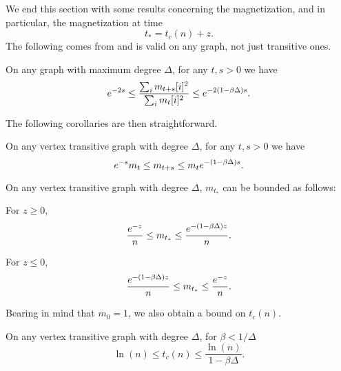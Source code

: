 
We end this section with some results concerning the magnetization, and in particular, the magnetization at time
\begin{equation}
	t_* = t_c(n) + z.
\end{equation}
The following comes from \cite{Lubetzky2017-nc} and is valid on any graph, not just transitive ones.
\begin{lemma}
	On any graph with maximum degree $\Delta$, for any $t, s > 0$ we have
	\begin{equation}
		e^{-2s} \leq \frac{\sum_i m_{t+s}[i]^2}{\sum_i m_t[i]^2} \leq e^{-2(1 - \beta \Delta)s}.
	\end{equation}
\end{lemma}
The following corollaries are then straightforward.
\begin{corollary}
	\label{cor:exponential decay magnetization}
	On any vertex transitive graph with degree $\Delta$, for any $t, s > 0$ we have
	\begin{equation}
		e^{-s} m_t \leq m_{t+s} \leq m_t e^{-(1 - \beta \Delta)s}.
	\end{equation}
\end{corollary}
\begin{corollary}
\label{cor:magnetization of t star}
	On any vertex transitive graph with degree $\Delta$, $m_{t_*}$ can be bounded as follows:

	For $z \geq 0$,
	\begin{equation}
		\frac{e^{-z}}{n} \leq m_{t_*} \leq \frac{e^{-(1 - \beta \Delta)z}}{n}.
	\end{equation}

	For $z \leq 0$,
	\begin{equation}
		\frac{e^{-(1 - \beta \Delta)z}}{n} \leq m_{t_*} \leq \frac{e^{-z}}{n}.
	\end{equation}
\end{corollary}
Bearing in mind that $m_0 = 1$, we also obtain a bound on $t_c(n)$.
\begin{corollary}
	On any vertex transitive graph with degree $\Delta$, for $\beta < 1/\Delta$
	\begin{equation}
		\ln(n) \leq t_c(n) \leq \frac{\ln(n)}{1 - \beta \Delta}.
	\end{equation}
\end{corollary}

